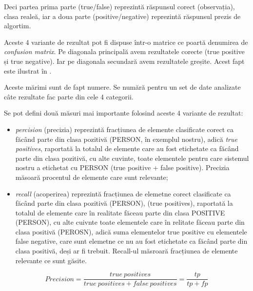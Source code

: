 Deci partea prima parte (true/false) reprezintă răspunsul corect (observația), clasa realeă, iar a doua parte (positive/negative) reprezintă răspunsul prezis de algortim.

Aceste 4 variante de rezultat pot fi dispuse într-o matrice ce poartă denumirea de \textit{confusion matrix}. Pe diagonala principală avem rezultatele corecte (true positive și true negative). Iar pe diagonala secundară avem rezultatele greșite. Acest fapt este ilustrat în .


Aceste mărimi sunt de fapt numere. Se numără pentru un set de date analizate câte rezultate fac parte din cele 4 categorii.

Se pot defini două măsuri mai importante folosind aceste 4 variante de rezultat:

\begin{itemize}
\item \textit{percision} (precizia) reprezintă fracțiunea de elemente clasificate corect ca făcând parte din clasa pozitivă (PERSON, în exemplul nostru), adică \textit{true positives}, raportată la totalul de elemente care au fost etichetate ca făcând parte din clasa pozitivă, cu alte cuvinte, toate elementele pentru care sistemul nostru a etichetat cu PERSON (true positive + false positive). Precizia măsoară procentul de elemente care sunt relevante;

\item \textit{recall} (acoperirea) reprezintă fracțiunea de elemetne corect clasificate ca făcând parte din clasa pozitivă (PERSON), (true positives), raportată la totalul de elemente care în realitate făceau parte din clasa POSITIVE (PERSON), cu alte cuivnte toate elementele care în relitate făceau parte din clasa positivă (PEROSN), adică suma elementelor true positive cu elementele false negative, care sunt elemetne ce nu au fost etichetate ca făcând parte din clasa positivă, deși ar fi trebuit. Recall-ul măsroară fracțiunea de elemente relevante ce sunt găsite.
\end{itemize}

\begin{equation}
Precision = \frac{true\ positives}{true\ positives + false\ positives} = \frac{tp}{tp + fp}
\end{equation}

